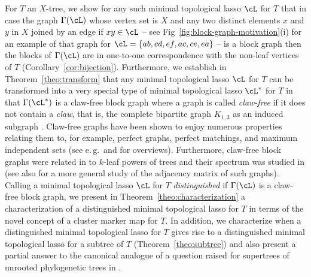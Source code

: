 For $T$ an $X$-tree, we show for any such minimal topological lasso $\cL$ for
$T$ that in case the graph $\Gamma(\cL)$ whose vertex set is $X$ and any two
distinct elements $x$ and $y$ in $X$ joined by an edge if $xy\in \cL$ -- see
Fig~\ref{fig:block-graph-motivation}(i) for an example of that graph for
$\cL=\{ab,cd,ef,ac,ce,ea\}$ -- is a block graph then the blocks of
$\Gamma(\cL)$ are in one-to-one correspondence with the non-leaf vertices of
$T$ (Corollary~\ref{cor:bijection}).  Furthermore, we establish in
Theorem~\ref{theo:transform} that any minimal topological lasso $\cL$ for $T$
can be transformed into a very special type of minimal topological lasso
$\cL^*$ for $T$ in that $\Gamma(\cL^*)$ is a claw-free block graph where a
graph is called {\em claw-free} if it does not contain a {\em claw}, that is,
the complete bipartite graph $K_{1,3}$ as an induced subgraph \cite{H72}.
Claw-free graphs have been shown to enjoy numerous properties relating them
to, for example, perfect graphs, perfect matchings, and maximum independent
sets (see e.\,g.\,\cite{FFZ97} and \cite{CFHV12} for overviews).  Furthermore,
claw-free block graphs were related in \cite{BL09} to $k$-leaf powers of trees
and their spectrum was studied in \cite{GS01, MSST06} (see also \cite{BR13}
for a more general study of the adjacency matrix of such graphs).  Calling a
minimal topological lasso $\cL$ for $T$ {\em distinguished} if $\Gamma(\cL)$
is a claw-free block graph, we present in Theorem~\ref{theo:characterization}
a characterization of a distinguished minimal topological lasso for $T$ in
terms of the novel concept of a cluster marker map for $T$. In addition, we
characterize when a distinguished minimal topological lasso for $T$ gives rise
to a distinguished minimal topological lasso for a subtree of $T$
(Theorem~\ref{theo:subtree}) and also present a partial answer to the
canonical analogue of a question raised for supertrees of unrooted
phylogenetic trees in \cite{DHS11}.

